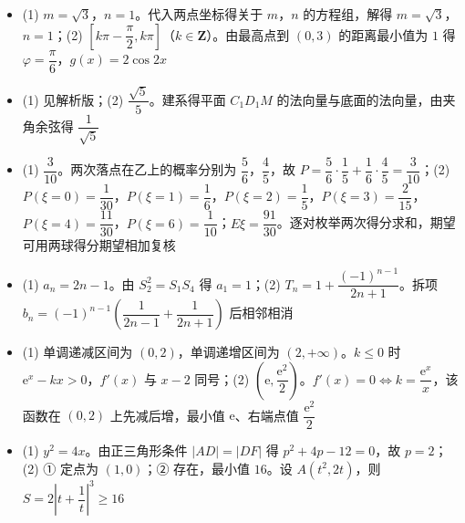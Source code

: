 \begin{itemize}[leftmargin=2.6em]
  \item[\textbf{16.}] (1) $m=\sqrt3$，$n=1$。代入两点坐标得关于 $m$，$n$ 的方程组，解得 $m=\sqrt3$，$n=1$；(2) $\left[k\pi-\dfrac\pi2,k\pi\right]$（$k\in\mathbf Z$）。由最高点到 $(0,3)$ 的距离最小值为 $1$ 得 $\varphi=\dfrac\pi6$，$g(x)=2\cos2x$
  \item[\textbf{17.}] (1) 见解析版；(2) $\dfrac{\sqrt5}5$。建系得平面 $C_1D_1M$ 的法向量与底面的法向量，由夹角余弦得 $\dfrac1{\sqrt5}$
  \item[\textbf{18.}] (1) $\dfrac3{10}$。两次落点在乙上的概率分别为 $\dfrac56$，$\dfrac45$，故 $P=\dfrac56\cdot\dfrac15+\dfrac16\cdot\dfrac45=\dfrac3{10}$；(2) $P(\xi=0)=\dfrac1{30}$，$P(\xi=1)=\dfrac16$，$P(\xi=2)=\dfrac15$，$P(\xi=3)=\dfrac2{15}$，$P(\xi=4)=\dfrac{11}{30}$，$P(\xi=6)=\dfrac1{10}$；$E\xi=\dfrac{91}{30}$。逐对枚举两次得分求和，期望可用两球得分期望相加复核
  \item[\textbf{19.}] (1) $a_n=2n-1$。由 $S_2^2=S_1S_4$ 得 $a_1=1$；(2) $T_n=1+\dfrac{(-1)^{n-1}}{2n+1}$。拆项 $b_n=(-1)^{n-1}\left(\dfrac1{2n-1}+\dfrac1{2n+1}\right)$ 后相邻相消
  \item[\textbf{20.}] (1) 单调递减区间为 $(0,2)$，单调递增区间为 $(2,+\infty)$。$k\leqslant0$ 时 $\mathrm e^x-kx>0$，$f'(x)$ 与 $x-2$ 同号；(2) $\left(\mathrm e,\dfrac{\mathrm e^2}2\right)$。$f'(x)=0\iff k=\dfrac{\mathrm e^x}x$，该函数在 $(0,2)$ 上先减后增，最小值 $\mathrm e$、右端点值 $\dfrac{\mathrm e^2}2$
  \item[\textbf{21.}] (1) $y^2=4x$。由正三角形条件 $|AD|=|DF|$ 得 $p^2+4p-12=0$，故 $p=2$；(2) ① 定点为 $(1,0)$；② 存在，最小值 $16$。设 $A(t^2,2t)$，则 $S=2\left|t+\dfrac1t\right|^3\geqslant16$
\end{itemize}
